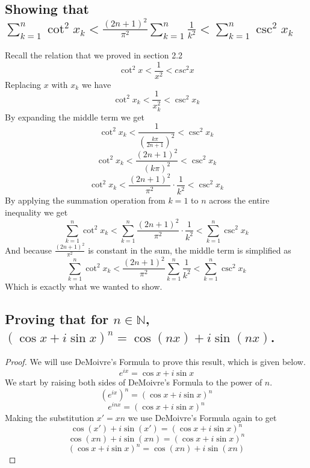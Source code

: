 \documentclass[11pt,reqno, tikz, border=3mm]{amsart}
\theoremstyle{plain}
\theoremstyle{definition}
\theoremstyle{remark}
\begin{document}
\subsection{Showing that $\sum^n_{k=1}\cot^2x_k < \frac{(2n+1)^2}{\pi^2}\sum^n_{k=1}\frac{1}{k^2} < \sum^n_{k=1}\csc^2x_k$}
Recall the relation that we proved in section 2.2
$$\cot^2x < \frac{1}{x^2} < csc^2x$$
Replacing $x$ with $x_k$ we have
$$\cot^2x_k < \frac{1}{x_k^2} < \csc^2 x_k$$
By expanding the middle term we get
$$\cot^2x_k < \frac{1}{(\frac{k\pi}{2n+1})^2} < \csc^2 x_k$$
$$\cot^2x_k < \frac{(2n+1)^2}{(k\pi)^2}< \csc^2 x_k$$
$$\cot^2x_k < \frac{(2n+1)^2}{\pi^2} \cdot \frac{1}{k^2} < \csc^2 x_k$$
By applying the summation operation from $k=1$ to $n$ across the entire inequality we get
$$\sum^n_{k=1} \cot^2x_k < \sum^n_{k=1}\frac{(2n+1)^2}{\pi^2} \cdot \frac{1}{k^2} < \sum^n_{k=1}\csc^2 x_k$$
And because $\frac{(2n+1)^2}{\pi^2}$ is constant in the sum, the middle term is simplified as
$$\sum^n_{k=1} \cot^2x_k < \frac{(2n+1)^2}{\pi^2} \sum^n_{k=1} \frac{1}{k^2} < \sum^n_{k=1}\csc^2 x_k$$
Which is exactly what we wanted to show.

\subsection{Proving that for $n \in \mathbb{N}$, $(\cos x + i \sin x)^n = \cos(nx) + i\sin(nx)$.} 
\begin{proof}
We will use DeMoivre's Formula to prove this result, which is given below.
$$e^{ix}=\cos x + i\sin x$$
We start by raising both sides of DeMoivre's Formula to the power of $n$.
$$\left(e^{ix}\right)^n = (\cos x + i\sin x)^n$$
$$e^{inx} = (\cos x + i\sin x)^n$$
Making the substitution $x' = xn$ we use DeMoivre's Formula again to get
$$\cos(x') + i\sin(x') = (\cos x + i\sin x)^n$$
$$\cos(xn) + i\sin(xn) = (\cos x + i\sin x)^n$$
$$(\cos x + i\sin x)^n = \cos(xn) + i\sin(xn)$$
\end{proof}
\end{document}
